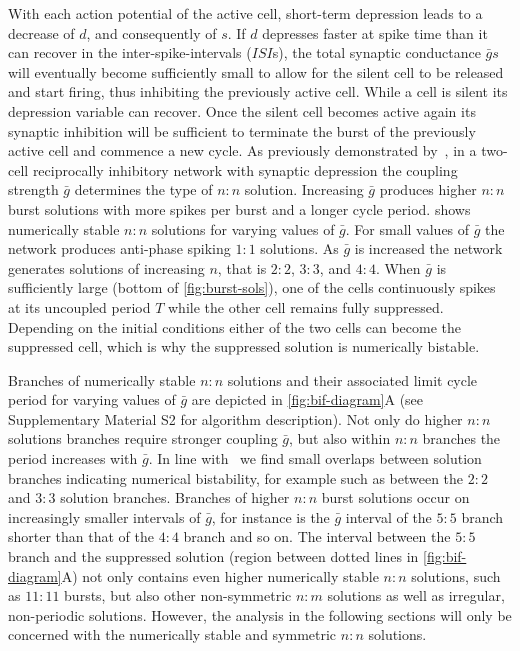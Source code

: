 \documentclass[utf8]{frontiersFPHY} %
\begin{document}
With each action potential of the active cell, short-term depression leads to a decrease of $d$, and consequently of $s$.
If $d$ depresses faster at spike time than it can recover in the inter-spike-intervals ($ISI$s), the total synaptic conductance $\bar g s$ will eventually become sufficiently small to allow for the silent cell to be released \citep{wang1992,skinner1994} and start firing, thus inhibiting the previously active cell.
While a cell is silent its depression variable can recover.
Once the silent cell becomes active again its synaptic inhibition will be sufficient to terminate the burst of the previously active cell and commence a new cycle.
As previously demonstrated by~\citet{bose2011}, in a two-cell reciprocally inhibitory network with synaptic depression the coupling strength $\bar g$ determines the type of $n:n$ solution.
Increasing $\bar g$ produces higher $n:n$ burst solutions with more spikes per burst and a longer cycle period.
 shows numerically stable $n:n$ solutions for varying values of $\bar g$.
For small values of $\bar g$ the network produces anti-phase spiking $1:1$ solutions.
As $\bar g$ is increased the network generates solutions of increasing $n$, that is $2:2$, $3:3$, and $4:4$.
When $\bar g$ is sufficiently large (bottom of \cref{fig:burst-sols}), one of the cells continuously spikes at its uncoupled period $T$ while the other cell remains fully suppressed.
Depending on the initial conditions either of the two cells can become the suppressed cell, which is why the suppressed solution is numerically bistable.

Branches of numerically stable $n:n$ solutions and their associated limit cycle period for varying values of $\bar g$ are depicted in \cref{fig:bif-diagram}A (see Supplementary Material S2 for algorithm description).
Not only do higher $n:n$ solutions branches require stronger coupling $\bar g$, but also within $n:n$ branches the period increases with $\bar g$.
In line with~\citet{bose2011} we find small overlaps between solution branches indicating numerical bistability, for example such as between the $2:2$ and $3:3$ solution branches.
Branches of higher $n:n$ burst solutions occur on increasingly smaller intervals of $\bar g$, for instance is the $\bar g$ interval of the $5:5$ branch shorter than that of the $4:4$ branch and so on.
The interval between the $5:5$ branch and the suppressed solution (region between dotted lines in \cref{fig:bif-diagram}A) not only contains even higher numerically stable $n:n$ solutions, such as $11:11$ bursts, but also other non-symmetric $n:m$ solutions as well as irregular, non-periodic solutions.
However, the analysis in the following sections will only be concerned with the numerically stable and symmetric $n:n$ solutions.
\end{document}
